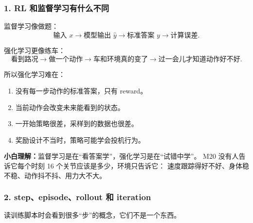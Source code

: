 \documentclass[UTF8,11pt,a4paper]{ctexart}
\begin{document}
\subsubsection{1. RL 和监督学习有什么不同}

监督学习像做题：
\[
\text{输入 }x
\rightarrow
\text{模型输出 }\hat y
\rightarrow
\text{标准答案 }y
\rightarrow
\text{计算误差}.
\]

强化学习更像练车：
\[
\text{看到路况}
\rightarrow
\text{做一个动作}
\rightarrow
\text{车和环境真的变了}
\rightarrow
\text{过一会儿才知道动作好不好}.
\]

所以强化学习难在：

\begin{enumerate}
  \item 没有每一步动作的标准答案，只有 reward。
  \item 当前动作会改变未来能看到的状态。
  \item 一开始策略很差，采样到的数据也很差。
  \item 奖励设计不当时，策略可能学会投机行为。
\end{enumerate}

\begin{answerbox}
\textbf{小白理解：}监督学习是在“看答案学”，强化学习是在“试错中学”。
M20 没有人告诉它每个时刻 16 个关节应该是多少，环境只告诉它：
速度跟踪得好不好、身体稳不稳、动作抖不抖、用力大不大。
\end{answerbox}

\subsubsection{2. step、episode、rollout 和 iteration}

读训练脚本时会看到很多“步”的概念，它们不是一个东西。
\end{document}
